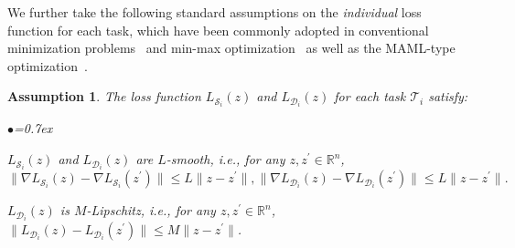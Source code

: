 \documentclass{osudissert96}
\newtheorem{assum}{Assumption}
\begin{document}
We further take the following standard assumptions on the {\em individual} loss function for each task, which have been commonly adopted in conventional minimization problems~\cite{ghadimi2013stochastic,wang2018spiderboost,ji2019improved} and min-max optimization~\cite{lin2020near} as well as the MAML-type optimization~\cite{finn2019online,ji2020multi}. 
\begin{assum}\label{assm:smooth}%
The loss function $L_{\mathcal{S}_i}(z)$ and $L_{\mathcal{D}_i}(z)$ for each task $\mathcal{T}_i$ satisfy:
\begin{list}{$\bullet$}{\topsep=0.7ex \leftmargin=0.3in \rightmargin=0.5in \itemsep =0.05in}
\vspace{0.2cm}
\item $L_{\mathcal{S}_i}(z)$ and $L_{\mathcal{D}_i}(z)$ are $L$-smooth, i.e., for any $z,z^\prime \in \mathbb{R}^{n}$, $$\|\nabla L_{\mathcal{S}_i}(z) - \nabla L_{\mathcal{S}_i}(z^\prime) \| \leq L\|z-z^\prime\|, \|\nabla L_{\mathcal{D}_i}(z) - \nabla L_{\mathcal{D}_i}(z^\prime) \| \leq L\|z-z^\prime\|.$$
\item $L_{\mathcal{D}_i}(z)$ is $M$-Lipschitz, i.e., for any $z,z^\prime\in \mathbb{R}^{n}$,  $\| L_{\mathcal{D}_i}(z) -  L_{\mathcal{D}_i}(z^\prime) \| \leq M\|z-z^\prime\|$.
\end{list}
\end{assum}
\end{document}
